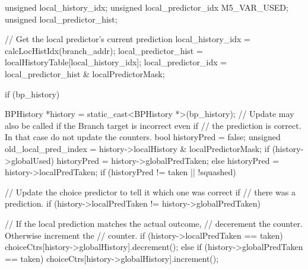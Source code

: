 \begin{DoxyCode}
{
    unsigned local_history_idx;
    unsigned local_predictor_idx M5_VAR_USED;
    unsigned local_predictor_hist;

    // Get the local predictor's current prediction
    local_history_idx = calcLocHistIdx(branch_addr);
    local_predictor_hist = localHistoryTable[local_history_idx];
    local_predictor_idx = local_predictor_hist & localPredictorMask;

    if (bp_history) {
        BPHistory *history = static_cast<BPHistory *>(bp_history);
        // Update may also be called if the Branch target is incorrect even if
        // the prediction is correct. In that case do not update the counters.
        bool historyPred = false;
        unsigned old_local_pred_index = history->localHistory
                      & localPredictorMask;
        if (history->globalUsed) {
           historyPred = history->globalPredTaken;
        } else {
           historyPred = history->localPredTaken;
        }
        if (historyPred != taken || !squashed) {
            // Update the choice predictor to tell it which one was correct if
            // there was a prediction.
            if (history->localPredTaken != history->globalPredTaken) {
                 // If the local prediction matches the actual outcome,
                 // decerement the counter.  Otherwise increment the
                 // counter.
                 if (history->localPredTaken == taken) {
                     choiceCtrs[history->globalHistory].decrement();
                 } else if (history->globalPredTaken == taken) {
                     choiceCtrs[history->globalHistory].increment();
                 }

             }

}}}
\end{DoxyCode}
